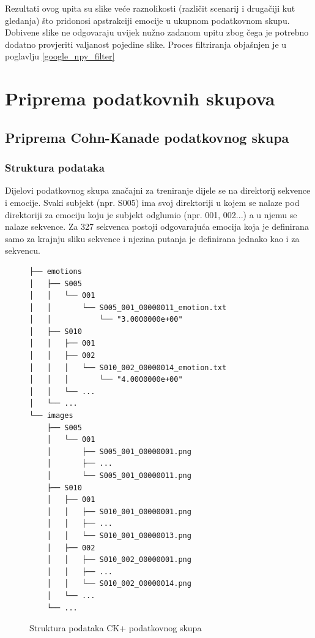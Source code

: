 \documentclass[times, utf8, zavrsni,numeric,pstricks]{fer}
\begin{document}
Rezultati ovog upita su slike veće raznolikosti (različit scenarij i drugačiji kut gledanja) što pridonosi apstrakciji emocije u ukupnom podatkovnom skupu. Dobivene slike ne odgovaraju uvijek nužno zadanom upitu zbog čega je potrebno dodatno provjeriti valjanost pojedine slike. Proces filtriranja objašnjen je u poglavlju \ref{google_npy_filter}


\section{Priprema podatkovnih skupova}
\subsection{Priprema Cohn-Kanade podatkovnog skupa}
\subsubsection{Struktura podataka}

Dijelovi podatkovnog skupa značajni za treniranje dijele se na direktorij sekvence i emocije. Svaki subjekt (npr. S005) ima svoj direktoriji u kojem se nalaze pod direktoriji za emociju koju je subjekt odglumio (npr. 001, 002...) a u njemu se nalaze sekvence. Za 327 sekvenca postoji odgovarajuća emocija koja je definirana samo za krajnju sliku sekvence i njezina putanja je definirana jednako kao i za sekvencu.

\pagebreak

\begin{figure}[H]
\centering
\begin{Verbatim}[fontsize=\small]
├── emotions
│   ├── S005
│   │   └── 001
│   │       └── S005_001_00000011_emotion.txt
│   │       	└── "3.0000000e+00"
│   ├── S010
│   │   ├── 001
│   │   ├── 002
│   │   │   └── S010_002_00000014_emotion.txt
│   │   │   	└── "4.0000000e+00"
│   │   └── ...
│   └── ...
└── images
    ├── S005
    │   └── 001
    │       ├── S005_001_00000001.png
    │       ├── ...
    │       └── S005_001_00000011.png
    ├── S010
    │   ├── 001
    │   │   ├── S010_001_00000001.png
    │   │   ├── ...
    │   │   └── S010_001_00000013.png
    │   ├── 002
    │   │   ├── S010_002_00000001.png
    │   │   ├── ...
    │   │   └── S010_002_00000014.png
    │   └── ...
    └── ...

\end{Verbatim}
\caption{Struktura podataka CK+ podatkovnog skupa}
\label{cb:npy_tree}
\end{figure}
\end{document}
